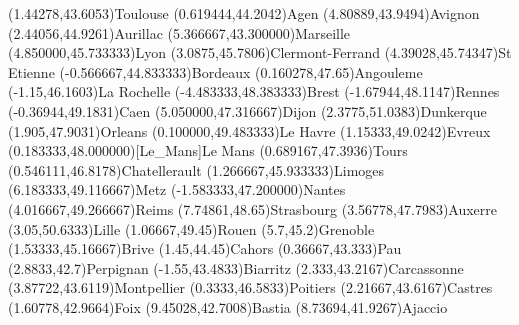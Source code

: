 \mapputIIID[90](1.44278,43.6053){Toulouse}
\mapputIIID[90](0.619444,44.2042){Agen}
\mapputIIID[90](4.80889,43.9494){Avignon}
\mapputIIID[90](2.44056,44.9261){Aurillac}
\mapputIIID[90](5.366667,43.300000){Marseille}
\mapputIIID[0](4.850000,45.733333){Lyon}
\mapputIIID[-90](3.0875,45.7806){Clermont-Ferrand}
\mapputIIID[90](4.39028,45.74347){St Etienne}
\mapputIIID[90](-0.566667,44.833333){Bordeaux}
\mapputIIID[90](0.160278,47.65){Angouleme}
\mapputIIID[90](-1.15,46.1603){La Rochelle}
\mapputIIID[90](-4.483333,48.383333){Brest}
\mapputIIID[90](-1.67944,48.1147){Rennes}
\mapputIIID[-90](-0.36944,49.1831){Caen}
\mapputIIID[90](5.050000,47.316667){Dijon}
\mapputIIID[30](2.3775,51.0383){Dunkerque}
\mapputIIID[90](1.905,47.9031){Orleans}
\mapputIIID[180](0.100000,49.483333){Le Havre}
\mapputIIID[90](1.15333,49.0242){Evreux}
\mapputIIID[90](0.183333,48.000000)[Le_Mans]{Le Mans}
\mapputIIID[90](0.689167,47.3936){Tours}
\mapputIIID[90](0.546111,46.8178){Chatellerault}
\mapputIIID[90](1.266667,45.933333){Limoges}
\mapputIIID[90](6.183333,49.116667){Metz}
\mapputIIID[90](-1.583333,47.200000){Nantes}
\mapputIIID[90](4.016667,49.266667){Reims}
\mapputIIID[30](7.74861,48.65){Strasbourg}
\mapputIIID[30](3.56778,47.7983){Auxerre}
\mapputIIID[90](3.05,50.6333){Lille}
\mapputIIID[90](1.06667,49.45){Rouen}
\mapputIIID[90](5.7,45.2){Grenoble}
\mapputIIID[90](1.53333,45.16667){Brive}
\mapputIIID[90](1.45,44.45){Cahors}
\mapputIIID[90](0.36667,43.333){Pau}
\mapputIIID[90](2.8833,42.7){Perpignan}
\mapputIIID[90](-1.55,43.4833){Biarritz}
\mapputIIID[90](2.333,43.2167){Carcassonne}
\mapputIIID[90](3.87722,43.6119){Montpellier}
\mapputIIID[90](0.3333,46.5833){Poitiers}
\mapputIIID[0](2.21667,43.6167){Castres}
\mapputIIID[90](1.60778,42.9664){Foix}
\mapputIIID[90](9.45028,42.7008){Bastia}
\mapputIIID[90](8.73694,41.9267){Ajaccio}
\endinput 
